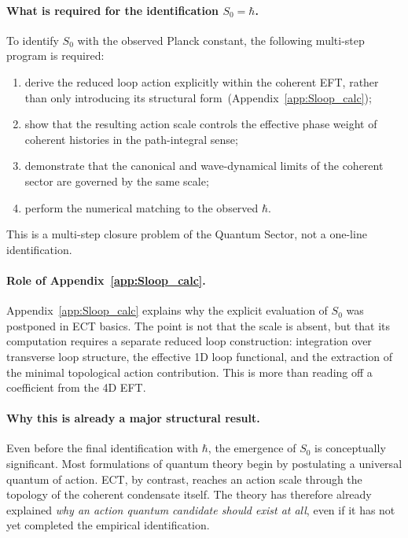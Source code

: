 \paragraph{What is required for the identification $S_0=\hbar$.}
To identify $S_0$ with the observed Planck constant, the following
multi-step program is required:
\begin{enumerate}[label=(\roman*)]
  \item derive the reduced loop action explicitly within the coherent
    EFT, rather than only introducing its structural
    form~(Appendix~\ref{app:Sloop_calc});
  \item show that the resulting action scale controls the effective
    phase weight of coherent histories in the path-integral sense;
  \item demonstrate that the canonical and wave-dynamical limits of the
    coherent sector are governed by the same scale;
  \item perform the numerical matching to the observed $\hbar$.
\end{enumerate}
This is a multi-step closure problem of the Quantum Sector, not a
one-line identification.

\paragraph{Role of Appendix~\ref{app:Sloop_calc}.}
Appendix~\ref{app:Sloop_calc} explains why the explicit evaluation of
$S_0$ was postponed in ECT basics.
The point is not that the scale is absent, but that its computation
requires a separate reduced loop construction: integration over
transverse loop structure, the effective 1D loop functional, and the
extraction of the minimal topological action contribution.
This is more than reading off a coefficient from the 4D EFT.

\paragraph{Why this is already a major structural result.}
Even before the final identification with $\hbar$, the emergence of
$S_0$ is conceptually significant.
Most formulations of quantum theory begin by postulating a universal
quantum of action.
ECT, by contrast, reaches an action scale through the topology of the
coherent condensate itself.
The theory has therefore already explained \emph{why an action quantum
candidate should exist at all}, even if it has not yet completed the
empirical identification.

